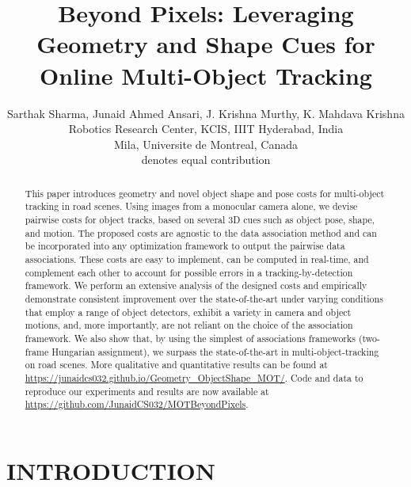 \documentclass[letterpaper, 10 pt, conference]{ieeeconf}
\title{\LARGE \bf 
Beyond Pixels: Leveraging Geometry and Shape Cues for Online Multi-Object Tracking
}
\author{Sarthak Sharma, Junaid Ahmed Ansari, J. Krishna Murthy, K. Mahdava Krishna \\
 \small Robotics Research Center, KCIS, IIIT Hyderabad, India \\
 \small Mila, Universite de Montreal, Canada \\
 \small denotes equal contribution}
\begin{document}



\begin{abstract}
This paper introduces geometry and novel object shape and pose costs for multi-object tracking in road scenes. Using images from a monocular camera alone, we devise pairwise costs for object tracks, based on several 3D cues such as object pose, shape, and motion. The proposed costs are agnostic to the data association method and can be incorporated into any optimization framework to output the pairwise data associations. These costs are easy to implement, can be computed in real-time, and complement each other to account for possible errors in a tracking-by-detection framework. We perform an extensive analysis of the designed costs and empirically demonstrate consistent improvement over the state-of-the-art under varying conditions that employ a range of object detectors, exhibit a variety in camera and object motions, and, more importantly, are not reliant on the choice of the  association framework. We also show that, by using the simplest of associations frameworks (two-frame Hungarian assignment), we surpass the state-of-the-art in multi-object-tracking on road scenes. More qualitative and quantitative results can be found at \url{https://junaidcs032.github.io/Geometry_ObjectShape_MOT/}. Code and data to reproduce our experiments and results are now available at \url{https://github.com/JunaidCS032/MOTBeyondPixels}. 

\end{abstract}


\section{INTRODUCTION}
\end{document}
